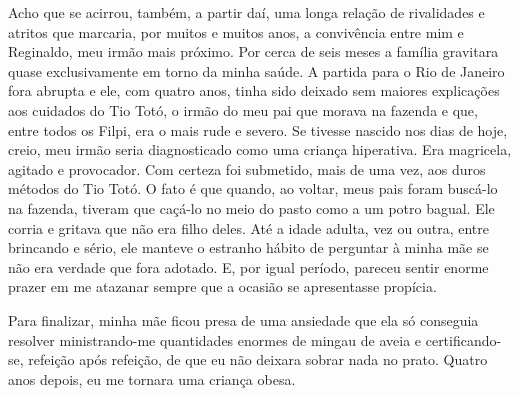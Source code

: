 Acho que se acirrou, também, a partir daí, uma longa relação de rivalidades e atritos que marcaria, por muitos e muitos anos, a convivência entre mim e Reginaldo, meu irmão mais próximo.
Por cerca de seis meses a família gravitara quase exclusivamente em torno da minha saúde.
A partida para o Rio de Janeiro fora abrupta e ele, com quatro anos, tinha sido deixado sem maiores explicações aos cuidados do Tio Totó, o irmão do meu pai que morava na fazenda e que, entre todos os Filpi, era o mais rude e severo. Se tivesse nascido nos dias de hoje, creio, meu irmão seria diagnosticado como uma criança hiperativa.
Era magricela, agitado e provocador.
Com certeza foi submetido, mais de uma vez, aos duros métodos do Tio Totó.
O fato é que quando, ao voltar, meus pais foram buscá-lo na fazenda, tiveram que caçá-lo no meio do pasto como a um potro bagual.
Ele corria e gritava que não era filho deles.
Até a idade adulta, vez ou outra, entre brincando e sério, ele manteve o estranho hábito de perguntar à minha mãe se não era verdade que fora adotado.
E, por igual período, pareceu sentir enorme prazer em me atazanar sempre que a ocasião se apresentasse propícia.

Para finalizar, minha mãe ficou presa de uma ansiedade que ela só conseguia resolver ministrando-me quantidades enormes de mingau de aveia e certificando-se, refeição após refeição, de que eu não deixara sobrar nada no prato. Quatro anos depois, eu me tornara uma criança obesa.
